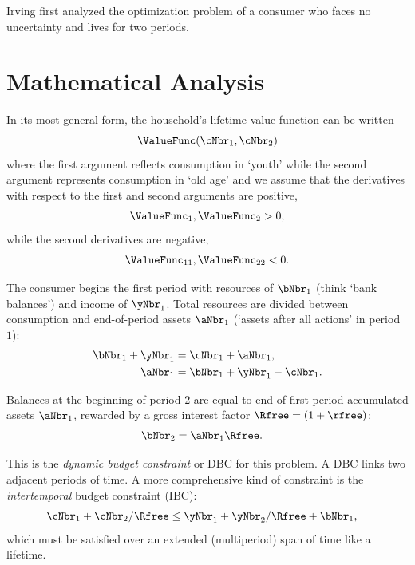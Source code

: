 
  Irving \cite{fisherInterestTheory} first analyzed the optimization
  problem of a consumer who faces no uncertainty and lives for two
  periods.

  \section{Mathematical Analysis}

  In its most general form, the household's lifetime value function can be written
  \[
    \ValueFunc(\cNbr_{1},\cNbr_{2})
  \]
  where the first argument reflects consumption in `youth' while the second argument represents consumption in `old age' and we assume that the derivatives with respect to the first and
  second arguments are positive,
  \begin{equation}
    \ValueFunc_{1}, \ValueFunc_{2} > 0, \label{eq:uprimepos}
  \end{equation}
  while the second derivatives are negative,
  \begin{equation}
    \ValueFunc_{11}, \ValueFunc_{22}<0 \label{eq:uprimeprimeneg}.
  \end{equation}

  The consumer begins the first period with resources of $\bNbr_{1}$ (think
  `bank balances') and income of $\yNbr_{1}$.  Total resources are divided between consumption
  and end-of-period assets $\aNbr_{1}$ (`assets after all actions' in period ${1}$):
  \begin{equation}\begin{gathered}\begin{aligned}
        \bNbr_{1}+\yNbr_{1} & =  \cNbr_{1}+\aNbr_{1},
        \\ \aNbr_{1} & =  \bNbr_{1}+\yNbr_{1}-\cNbr_{1}.
      \end{aligned}\end{gathered}\end{equation}

  Balances at the beginning of period 2 are equal to end-of-first-period
  accumulated assets $\aNbr_{1}$, rewarded by a gross interest factor $\Rfree = (1+\rfree)$:
  \begin{equation}\begin{gathered}\begin{aligned}
        \bNbr_{2} & =  \aNbr_{1}\Rfree.
      \end{aligned}\end{gathered}\end{equation}

  This is the \textit{dynamic budget constraint} or DBC for this problem.
  A DBC links two adjacent periods of time.  A more comprehensive kind
  of constraint is the \textit{intertemporal} budget constraint (IBC):
  \begin{equation}\begin{gathered}\begin{aligned}
        \cNbr_{1}+\cNbr_{2}/\Rfree & \leq  \yNbr_{1}+\yNbr_{2}/\Rfree+\bNbr_{1} \label{eq:ibcineq},
      \end{aligned}\end{gathered}\end{equation}
  which must be satisfied over an extended (multiperiod) span of time like a lifetime.

